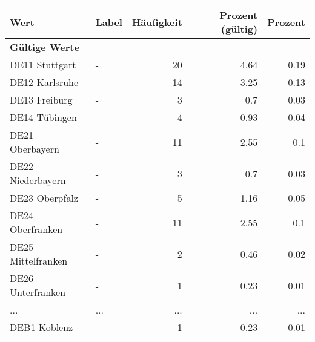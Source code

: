      \begin{longtable}{Xlrrr}
     \toprule
     \textbf{Wert} & \textbf{Label} & \textbf{Häufigkeit} & \textbf{Prozent (gültig)} & \textbf{Prozent} \\
     \endhead
     \midrule
     \multicolumn{5}{l}{\textbf{Gültige Werte}}\\
        \multicolumn{1}{X}{DE11 Stuttgart} & - & \num{20} & \num[round-mode=places,round-precision=2]{4.64} & \num[round-mode=places,round-precision=2]{0.19} \\
        \multicolumn{1}{X}{DE12 Karlsruhe} & - & \num{14} & \num[round-mode=places,round-precision=2]{3.25} & \num[round-mode=places,round-precision=2]{0.13} \\
        \multicolumn{1}{X}{DE13 Freiburg} & - & \num{3} & \num[round-mode=places,round-precision=2]{0.7} & \num[round-mode=places,round-precision=2]{0.03} \\
        \multicolumn{1}{X}{DE14 Tübingen} & - & \num{4} & \num[round-mode=places,round-precision=2]{0.93} & \num[round-mode=places,round-precision=2]{0.04} \\
        \multicolumn{1}{X}{DE21 Oberbayern} & - & \num{11} & \num[round-mode=places,round-precision=2]{2.55} & \num[round-mode=places,round-precision=2]{0.1} \\
        \multicolumn{1}{X}{DE22 Niederbayern} & - & \num{3} & \num[round-mode=places,round-precision=2]{0.7} & \num[round-mode=places,round-precision=2]{0.03} \\
        \multicolumn{1}{X}{DE23 Oberpfalz} & - & \num{5} & \num[round-mode=places,round-precision=2]{1.16} & \num[round-mode=places,round-precision=2]{0.05} \\
        \multicolumn{1}{X}{DE24 Oberfranken} & - & \num{11} & \num[round-mode=places,round-precision=2]{2.55} & \num[round-mode=places,round-precision=2]{0.1} \\
        \multicolumn{1}{X}{DE25 Mittelfranken} & - & \num{2} & \num[round-mode=places,round-precision=2]{0.46} & \num[round-mode=places,round-precision=2]{0.02} \\
        \multicolumn{1}{X}{DE26 Unterfranken} & - & \num{1} & \num[round-mode=places,round-precision=2]{0.23} & \num[round-mode=places,round-precision=2]{0.01} \\
       ... & ... & ... & ... & ... \\
        \multicolumn{1}{X}{DEB1 Koblenz} & - & \num{1} & \num[round-mode=places,round-precision=2]{0.23} & \num[round-mode=places,round-precision=2]{0.01} \\

\end{longtable}
